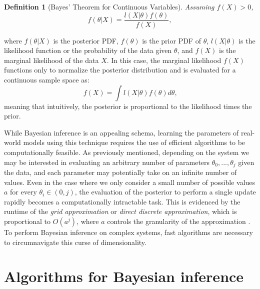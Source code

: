 \documentclass[
  12pt,
]{book}
\theoremstyle{definition}
\newtheorem{definition}{Definition}[chapter]
\theoremstyle{definition}
\theoremstyle{definition}
\theoremstyle{remark}
\begin{document}
\begin{definition}[Bayes' Theorem for Continuous Variables]
\protect\hypertarget{def:bayesprob}{}{\label{def:bayesprob} {} }\emph{Assuming \(f(X)>0\),}
\[f(\theta|X)=\frac{l(X|\theta)f(\theta)}{f(X)},\]
\end{definition}
where \(f(\theta|X)\) is the posterior PDF, \(f(\theta)\) is the prior PDF of \(\theta\), \(l(X|\theta)\) is the likelihood function or the probability of the data given \(\theta\), and \(f(X)\) is the marginal likelihood of the data \(X\).
In this case, the marginal likelihood \(f(X)\) functions only to normalize the posterior distribution and is evaluated for a continuous sample space as:
\[f(X)=\int l(X|\theta)f(\theta)d\theta \textrm{,}\]
meaning that intuitively, the posterior is proportional to the likelihood times the prior.

While Bayesian inference is an appealing schema, learning the parameters of real-world models using this technique requires the use of efficient algorithms to be computationally feasible.
As previously mentioned, depending on the system we may be interested in evaluating an arbitrary number of parameters \(\theta_0, ..., \theta_j\) given the data, and each parameter may potentially take on an infinite number of values.
Even in the case where we only consider a small number of possible values \(a\) for every \(\theta_i \in (0,j)\), the evaluation of the posterior to perform a single update rapidly becomes a computationally intractable task.
This is evidenced by the runtime of the \emph{grid approximation} or \emph{direct discrete approximation}, which is proportional to \(O(a^{j})\), where \(a\) controls the granularity of the approximation \citep[  10.1]{Gelman2013}.
To perform Bayesian inference on complex systems, fast algorithms are necessary to circumnavigate this curse of dimensionality.

\hypertarget{algorithms-for-bayesian-inference}{%
\chapter{Algorithms for Bayesian inference}\label{algorithms-for-bayesian-inference}}
\end{document}
